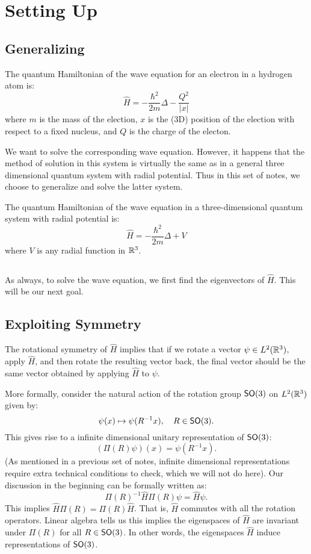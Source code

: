 \section{Setting Up}

\subsection{Generalizing}
The quantum Hamiltonian of the wave equation for an electron in a hydrogen atom is:
\[
    \hat{H} = - \frac{\hbar^2}{2m}\Delta - \frac{Q^2}{|x|}
\]
where $m$ is the mass of the election, $x$ is the (3D) position of the election with respect to a fixed nucleus, and $Q$ is the charge of the electon.

We want to solve the corresponding wave equation. However, it happens that the method of solution in this system is virtually the same as in a general three dimensional quantum system with radial potential. Thus in this set of notes, we choose to generalize and solve the latter system.

The quantum Hamiltonian of the wave equation in a three-dimensional quantum system with radial potential is:
\[
    \hat{H} = - \frac{\hbar^2}{2m}\Delta + V
\]
where $V$ is any radial function in ${\mathbb R}^3$. 

\subsection{}
As always, to solve the wave equation, we first find the eigenvectors of $\hat{H}$. This will be our next goal.

\subsection{Exploiting Symmetry}
The rotational symmetry of $\hat{H}$ implies that if we rotate a vector $\psi \in L^2({\mathbb R}^3)$, apply $\hat{H}$, and then rotate the resulting vector back, the final vector should be the same vector obtained by applying $\hat{H}$ to $\psi$.

More formally, consider the natural action of the rotation group $\operatorname{\textsf{SO}}(3)$ on $L^2({\mathbb R}^3)$ given by:
\[
    \psi(x) \mapsto \psi(R^{-1}x), \quad R \in \operatorname{\textsf{SO}}(3).
\]
This gives rise to a infinite dimensional unitary representation of $\operatorname{\textsf{SO}}(3)$:
\[
    (\Pi(R)\psi)(x) = \psi(R^{-1}x).
\]
(As mentioned in a previous set of notes, infinite dimensional representations require extra technical conditions to check, which we will not do here). Our discussion in the beginning can be formally written as:
\[
    \Pi(R)^{-1}\hat{H}\Pi(R)\psi = \hat{H}\psi.
\]
This implies $\hat{H}\Pi(R) = \Pi(R)\hat{H}$. That is, $\hat{H}$ commutes with all the rotation operators. Linear algebra tells us this implies the eigenspaces of $\hat{H}$ are invariant under $\Pi(R)$ for all $R \in \operatorname{\textsf{SO}}(3)$. In other words, the eigenspaces $\hat{H}$ induce representations of $\operatorname{\textsf{SO}}(3)$.

